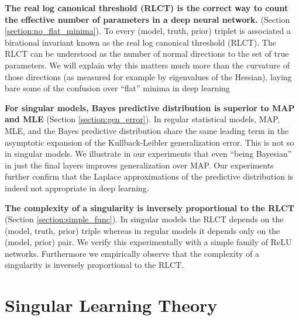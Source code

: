 \documentclass{article} %
\begin{document}
\textbf{The real log canonical threshold (RLCT) is the correct way to count the effective number of parameters in a deep neural network.} (Section \ref{section:no_flat_minima}). 
    To every (model, truth, prior) triplet is associated a birational invariant known as the real log canonical threshold (RLCT). The RLCT can be understood as the number of normal directions to the set of true parameters. We will explain why this matters much more than the curvature of those directions (as measured for example by eigenvalues of the Hessian), laying bare some of the confusion over ``flat'' minima in deep learning 

\textbf{For singular models, Bayes predictive distribution is superior to MAP and MLE} (Section \ref{section:gen_error}). In regular statistical models, MAP, MLE, and the Bayes predictive distribution share the same leading term in the asymptotic expansion of the Kullback-Leibler generalization error. This is not so in singular models. We illustrate in our experiments that even ``being Bayesian'' in just the final layers improves generalization over MAP. Our experiments further confirm that the Laplace approximations of the predictive distribution is indeed not appropriate in deep learning.

\textbf{The complexity of a singularity is inversely proportional to the RLCT} (Section \ref{section:simple_func}). In singular models the RLCT depends on the (model, truth, prior) triple whereas in regular models it depends only on the (model, prior) pair.
     We verify this experimentally with a simple family of ReLU networks. Furthermore we empirically observe that the complexity of a singularity is inversely proportional to the RLCT.


\section{Singular Learning Theory}
\end{document}
